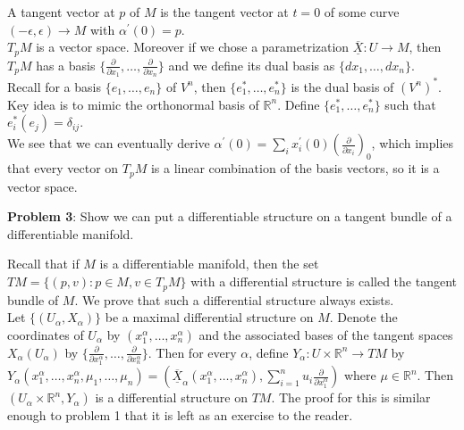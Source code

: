 \documentclass[12pt,letterpaper,cm]{hmcpset}
\newcommand{\X}{\overline{\underline{X}}}
\begin{document}
\begin{solution}
A tangent vector at $p$ of $M$ is the tangent vector at $t = 0$ of some curve $(-\epsilon, \epsilon) \to M$ with $\alpha^\prime(0) = p$. \\
$T_pM$ is a vector space. Moreover if we chose a parametrization $\X: U \to M$, then $T_pM$ has a basis $\{\frac{\partial}{\partial x_1}, \ldots, \frac{\partial}{\partial x_n} \}$ and we define its dual basis as $\{dx_1, \ldots, dx_n \}$. \\
Recall for a basis $\{e_1, \ldots, e_n \}$ of $V^n$, then $\{e_1^*, \ldots, e_n^* \}$ is the dual basis of $(V^n)^*$. Key idea is to mimic the orthonormal basis of $\mathbb{R}^n$. Define $\{e_1^*, \ldots, e_n^* \}$ such that $e_i^* (e_j) = \delta_{ij}$. \\
We see that we can eventually derive $\alpha^\prime(0) = \sum_i x_i^\prime (0) (\frac{\partial}{\partial x_i})_0$, which implies that every vector on $T_p M$ is a linear combination of the basis vectors, so it is a vector space.

\end{solution}

\textbf{Problem 3}: Show we can put a differentiable structure on a tangent bundle of a differentiable manifold.

\begin{solution}
Recall that if $M$ is a differentiable manifold, then the set $TM = \{(p, v) : p \in M, v \in T_pM \}$ with a differential structure is called the tangent bundle of $M$. We prove that such a differential structure always exists. \\

Let $\{(U_\alpha, X_\alpha) \}$ be a maximal differential structure on $M$. Denote the coordinates of $U_\alpha$ by $(x_1^\alpha, \ldots, x_n^\alpha)$ and the associated bases of the tangent spaces $X_\alpha(U_\alpha)$ by $\{\frac{\partial}{\partial x_1^\alpha}, \ldots, \frac{\partial}{\partial x_n^\alpha} \}$. Then for every $\alpha$, define $Y_\alpha: U \times \mathbb{R}^n \to TM$ by $Y_\alpha(x_1^\alpha, \dots, x_n^\alpha, \mu_1, \ldots, \mu_n) = (\X_\alpha(x_1^\alpha, \ldots, x_n^\alpha), \sum_{i=1}^n u_i \frac{\partial}{\partial x_1^\alpha})$ where $\mu \in \mathbb{R}^n$. Then $(U_\alpha \times \mathbb{R}^n, Y_\alpha)$ is a differential structure on $TM$. The proof for this is similar enough to problem 1 that it is left as an exercise to the reader.

\end{solution}
\end{document}
